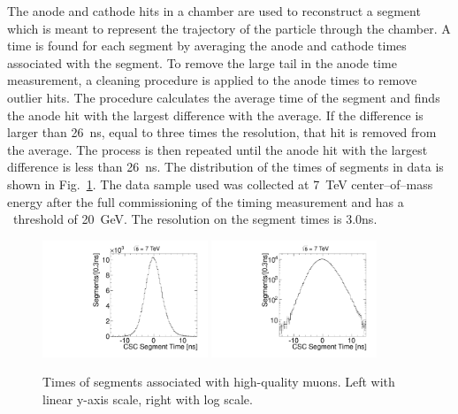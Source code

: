 The anode and cathode hits in a chamber are used to reconstruct a segment which is meant to represent the trajectory of the particle through the chamber. A time is
found for each segment by averaging the anode and cathode times associated with the segment. 
To remove the large tail in the anode time measurement,
a cleaning procedure is applied to the anode times to remove outlier hits. The procedure calculates the average time of the segment and finds the anode hit with the largest
difference with the average. If the difference is larger than 26~ns, equal to three times the resolution,
that hit is removed from the average. The process is then repeated until the
anode hit with the largest difference is less than 26~ns.
The distribution of the times of segments in data is shown in Fig.~\ref{fig:SegTimes}. 
The data sample used was collected at 7~TeV center--of--mass energy after the full commissioning of the timing measurement and has a \pt\ threshold of 20~GeV.
The resolution on the segment times is 3.0ns.

\begin{figure}
  \begin{center}
      \includegraphics[width=0.44\textwidth]{figures/timing/StripAndWireSegmentTime}
      \includegraphics[width=0.44\textwidth]{figures/timing/StripAndWireSegmentTimeLog}
      \caption[Distribution of times of segments]
      {Times of segments associated with high-quality muons. Left with linear y-axis scale, right with log scale.
        }
      \label{fig:SegTimes}
  \end{center}
\end{figure}


